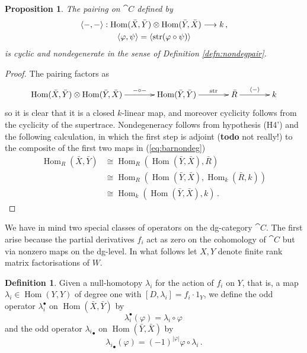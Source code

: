 \documentclass{compositio}
\newtheorem{proposition}[theorem]{Proposition}
\theoremstyle{definition}
\newtheorem{definition}[theorem]{Definition}
\numberwithin{equation}{section}
\def\Hom{\operatorname{Hom}}
\DeclareMathOperator{\str}{str}
\begin{document}
\begin{proposition}\label{prop:barnondeg} The pairing on $\cat{C}$ defined by
\begin{gather*}
\langle -, - \rangle: \Hom(\bar{X}, \bar{Y}) \otimes \Hom(\bar{Y}, \bar{X}) \lto k\,,\\
\langle \varphi, \psi \rangle = \langle \str( \varphi \circ \psi ) \rangle
\end{gather*}
is cyclic and nondegenerate in the sense of Definition \ref{defn:nondegpair}.
\end{proposition}
\begin{proof}
The pairing factors as
\begin{equation}\label{eq:barnondeg}
\xymatrix@C+1pc{
\Hom(\bar{X}, \bar{Y}) \otimes \Hom(\bar{Y}, \bar{X}) \ar[r]^-{-\circ-} & \Hom(\bar{Y}, \bar{Y}) \ar[r]^-{\str} & \bar{R} \ar[r]^-{\langle - \rangle} & k
}
\end{equation}
so it is clear that it is a closed $k$-linear map, and moreover cyclicity follows from the cyclicity of the supertrace. Nondegeneracy follows from hypothesis (H4') and the following calculation, in which the first step is adjoint (\textbf{todo} not really!) to the composite of the first two maps in (\ref{eq:barnondeg})
\begin{align*}
\Hom_R(\bar{X}, \bar{Y}) &\cong \Hom_R( \Hom(\bar{Y}, \bar{X}), \bar{R} )\,\\
&\cong \Hom_R( \Hom(\bar{Y}, \bar{X}), \Hom_k( \bar{R}, k) )\\
&\cong \Hom_k( \Hom(\bar{Y}, \bar{X}), k )\,.
\end{align*}
\end{proof}

We have in mind two special classes of operators on the dg-category $\cat{C}$. The first arise because the partial derivatives $f_i$ act as zero on the cohomology of $\cat{C}$ but via nonzero maps on the dg-level. In what follows let $X,Y$ denote finite rank matrix factorisations of $W$.

\begin{definition} Given a null-homotopy $\lambda_i$ for the action of $f_i$ on $Y$, that is, a map $\lambda_i \in \Hom(Y,Y)$ of degree one with $[D, \lambda_i] = f_i \cdot 1_Y$, we define the odd operator $\lambda_i^\bullet$ on $\Hom(\bar{X},\bar{Y})$ by
\[
\lambda_i^\bullet(\varphi) = \lambda_i \circ \varphi\,
\]
and the odd operator ${\lambda_i}_\bullet$ on $\Hom(\bar{Y}, \bar{X})$ by
\[
{\lambda_i}_\bullet(\varphi) = (-1)^{|\varphi|} \varphi \circ \lambda_i \,.
\]
\end{definition}
\end{document}
